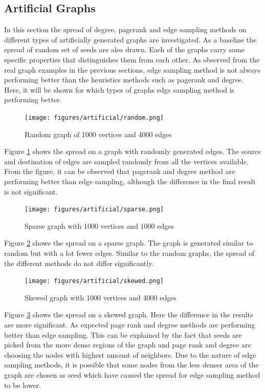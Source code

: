\documentclass[english]{tktltiki}
\begin{document}
\subsection{Artificial Graphs}
In this section the spread of degree, pagerank and edge sampling methods on different types of artificially generated graphs are investigated. As a baseline the spread of random set of seeds are also drawn. 
Each of the graphs carry some specific properties that distinguishes them from each other. 
As observed from the real graph examples in the previous sections, edge sampling method is not always performing better than the heuristics methods such as pagerank and degree. 
Here, it will be shown for which types of graphs edge sampling method is performing better. 
\begin{figure}[ht!]
\centering
\texttt{[image: figures/artificial/random.png]}
\caption{Random graph of 1000 vertices and 4000 edges}
\label{art:random}
\end{figure}

Figure \ref{art:random} shows the spread on a graph with randomly generated edges. 
The source and destination of edges are sampled randomly from all the vertices available. 
From the figure, it can be observed that pagerank and degree method are performing better than edge sampling, although the difference in the final result is not significant. 

\begin{figure}[ht!]
\centering
\texttt{[image: figures/artificial/sparse.png]}
\caption{Sparse graph with 1000 vertices and 1000 edges}
\label{art:sparse}
\end{figure}

Figure \ref{art:sparse} shows the spread on a sparse graph. 
The graph is generated similar to random but with a lot fewer edges. 
Similar to the random graphs, the spread of the different methods do not differ significantly.

\begin{figure}[ht!]
\centering
\texttt{[image: figures/artificial/skewed.png]}
\caption{Skewed graph with 1000 vertices and 4000 edges}
\label{art:skewed}
\end{figure}

Figure \ref{art:skewed} shows the spread on a skewed graph. 
Here the difference in the results are more significant. 
As expected page rank and degree methods are performing better than edge sampling. 
This can be explained by the fact that seeds are picked from the more dense regions of the graph and page rank and degree are choosing the nodes with highest amount of neighbors. 
Due to the nature of edge sampling methods, it is possible that some nodes from the less denser area of the graph are chosen as seed which have caused the spread for edge sampling method to be lower.
\end{document}
